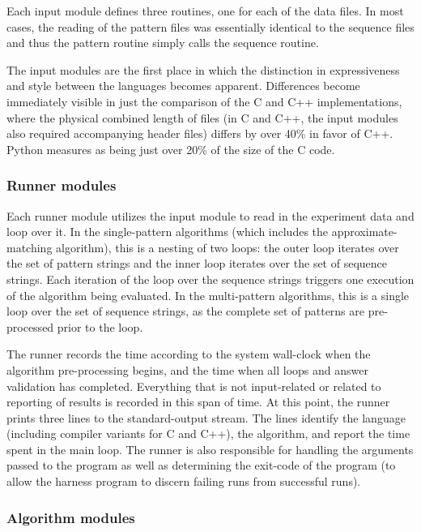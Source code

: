 Each input module defines three routines, one for each of the data files. In most cases, the reading of the pattern files was essentially identical to the sequence files and thus the pattern routine simply calls the sequence routine.

The input modules are the first place in which the distinction in expressiveness and style between the languages becomes apparent. Differences become immediately visible in just the comparison of the C and C++ implementations, where the physical combined length of files (in C and C++, the input modules also required accompanying header files) differs by over 40\% in favor of C++. Python measures as being just over 20\% of the size of the C code.

\subsubsection{Runner modules}

Each runner module utilizes the input module to read in the experiment data and loop over it. In the single-pattern algorithms (which includes the approximate-matching algorithm), this is a nesting of two loops: the outer loop iterates over the set of pattern strings and the inner loop iterates over the set of sequence strings. Each iteration of the loop over the sequence strings triggers one execution of the algorithm being evaluated. In the multi-pattern algorithms, this is a single loop over the set of sequence strings, as the complete set of patterns are pre-processed prior to the loop.

The runner records the time according to the system wall-clock when the algorithm pre-processing begins, and the time when all loops and answer validation has completed. Everything that is not input-related or related to reporting of results is recorded in this span of time. At this point, the runner prints three lines to the standard-output stream. The lines identify the language (including compiler variants for C and C++), the algorithm, and report the time spent in the main loop. The runner is also responsible for handling the arguments passed to the program as well as determining the exit-code of the program (to allow the harness program to discern failing runs from successful runs).

\subsubsection{Algorithm modules}

